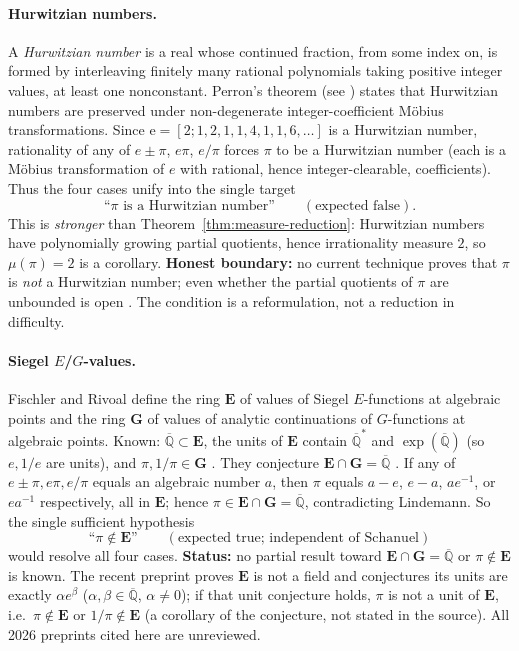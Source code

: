\documentclass[11pt]{amsart}
\theoremstyle{definition}
\theoremstyle{remark}
\numberwithin{equation}{section}
\newcommand{\Q}{\mathbb{Q}}
\newcommand{\irr}{\mu}
\newcommand{\ee}{\mathrm{e}}
\begin{document}
\paragraph{Hurwitzian numbers.} A \emph{Hurwitzian number} is a real whose continued fraction, from some index on, is formed by interleaving finitely many rational polynomials taking positive integer values, at least one nonconstant. Perron's theorem (see \cite[p.~141]{Stambul}) states that Hurwitzian numbers are preserved under non-degenerate integer-coefficient M\"obius transformations. Since $\ee=[2;1,2,1,1,4,1,1,6,\dots]$ is a Hurwitzian number, rationality of any of $e\pm\pi$, $e\pi$, $e/\pi$ forces $\pi$ to be a Hurwitzian number (each is a M\"obius transformation of $e$ with rational, hence integer-clearable, coefficients). Thus the four cases unify into the single target
\[
\text{``$\pi$ is a Hurwitzian number''}\qquad(\text{expected false}).
\]
This is \emph{stronger} than Theorem~\ref{thm:measure-reduction}: Hurwitzian numbers have polynomially growing partial quotients, hence irrationality measure $2$, so $\irr(\pi)=2$ is a corollary. \textbf{Honest boundary:} no current technique proves that $\pi$ is \emph{not} a Hurwitzian number; even whether the partial quotients of $\pi$ are unbounded is open \cite{Hildebrand2024}. The condition is a reformulation, not a reduction in difficulty.

\paragraph{Siegel \texorpdfstring{$E$}{E}/$G$-values.} Fischler and Rivoal \cite{FischlerRivoal2016} define the ring $\mathbf{E}$ of values of Siegel $E$-functions at algebraic points and the ring $\mathbf{G}$ of values of analytic continuations of $G$-functions at algebraic points. Known: $\overline{\Q}\subset\mathbf{E}$, the units of $\mathbf{E}$ contain $\overline{\Q}^*$ and $\exp(\overline{\Q})$ (so $e,1/e$ are units), and $\pi,1/\pi\in\mathbf{G}$ \cite{FischlerRivoal2014}. They conjecture $\mathbf{E}\cap\mathbf{G}=\overline{\Q}$ \cite{FischlerRivoal2024}. If any of $e\pm\pi,e\pi,e/\pi$ equals an algebraic number $a$, then $\pi$ equals $a-e$, $e-a$, $ae^{-1}$, or $ea^{-1}$ respectively, all in $\mathbf{E}$; hence $\pi\in\mathbf{E}\cap\mathbf{G}=\overline{\Q}$, contradicting Lindemann. So the single sufficient hypothesis
\[
\text{``$\pi\notin\mathbf{E}$''}\qquad(\text{expected true; independent of Schanuel})
\]
would resolve all four cases. \textbf{Status:} no partial result toward $\mathbf{E}\cap\mathbf{G}=\overline{\Q}$ or $\pi\notin\mathbf{E}$ is known. The recent preprint \cite{FischlerRivoal2026} proves $\mathbf{E}$ is not a field and conjectures its units are exactly $\alpha e^\beta$ ($\alpha,\beta\in\overline{\Q}$, $\alpha\ne0$); if that unit conjecture holds, $\pi$ is not a unit of $\mathbf{E}$, i.e.\ $\pi\notin\mathbf{E}$ or $1/\pi\notin\mathbf{E}$ (a corollary of the conjecture, not stated in the source). All 2026 preprints cited here are unreviewed.
\end{document}
